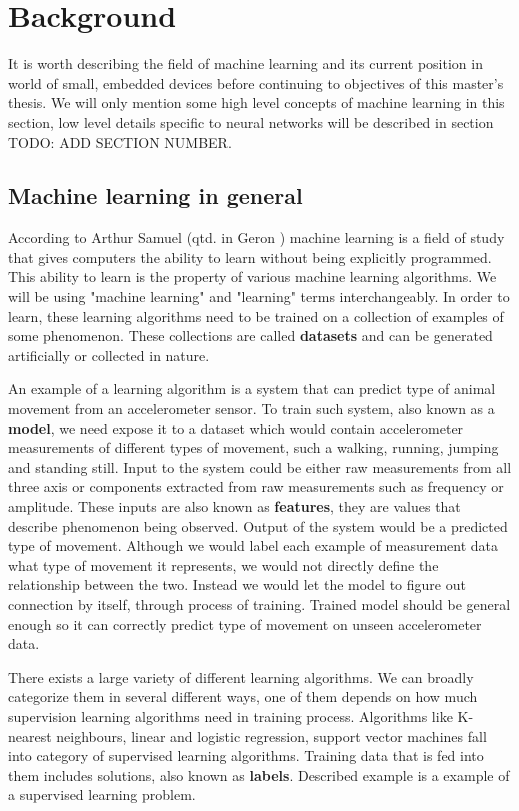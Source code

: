 \section{ Background}

It is worth describing the field of machine learning and its current position in world of small, embedded devices before continuing to objectives of this master's thesis.
We will only mention some high level concepts of machine learning in this section, low level details specific to neural networks will be described in section TODO: ADD SECTION NUMBER.

\subsection{ Machine learning in general}

According to Arthur Samuel (qtd. in Geron \cite{geron}) machine learning is a field of study that gives computers the ability to learn without being explicitly programmed.
This ability to learn is the property of various machine learning algorithms.
We will be using "machine learning" and "learning" terms interchangeably. 
In order to learn, these learning algorithms need to be trained on a collection of examples of some phenomenon\cite{burkovml}. 
These collections are called \textbf{datasets} and can be generated artificially or collected in nature.

An example of a learning algorithm is a system that can predict type of animal movement from an accelerometer sensor.
To train such system, also known as a \textbf{model}, we need expose it to a dataset which would contain accelerometer measurements of different types of movement, such a walking, running, jumping and standing still.
Input to the system could be either raw measurements from all three axis or components extracted from raw measurements such as frequency or amplitude. 
These inputs are also known as \textbf{features}, they are values that describe phenomenon being observed\cite{burkovml}. 
Output of the system would be a predicted type of movement.
Although we would label each example of measurement data what type of movement it represents, we would not directly define the relationship between the two.
Instead we would let the model to figure out connection by itself, through process of training.
Trained model should be general enough so it can correctly predict type of movement on unseen accelerometer data.

There exists a large variety of different learning algorithms. 
We can broadly categorize them in several different ways, one of them depends on how much supervision learning algorithms need in training process. 
Algorithms like K-nearest neighbours, linear and logistic regression, support vector machines fall into category of supervised learning algorithms.
Training data that is fed into them includes solutions, also known as \textbf{labels}\cite{geron}.
Described example is a example of a supervised learning problem.

